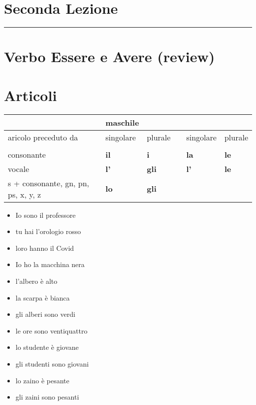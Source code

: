\documentclass[letter,11pt]{article}
\begin{document}
\section*{\Large{Seconda Lezione}}
\noindent\rule{16cm}{1pt}

\section*{Verbo Essere e Avere (review)}

\section*{Articoli}


\begin{tabular}{ |p{3cm}| p{0.2cm}| p{2cm}| p{2cm}| p{0.2cm}| p{2cm}| p{2cm}| }
     &  & {\bf maschile} & & & & \\
    \hline
     aricolo preceduto da &  & singolare & plurale & & singolare & plurale \\
    \hline
    \hline
     &  &  & & & & \\ \hline
    consonante &  & {\bf il} & {\bf i} & & {\bf la}  & {\bf le} \\ \hline
    vocale & & {\bf l'} & {\bf gli} & & {\bf l'}  & {\bf le} \\ \hline
    s + consonante, gn, pn, ps, x, y, z & & {\bf lo} & {\bf gli} &   \\
    \hline
    \hline
\end{tabular}

\vskip 0.5in
\begin{multicols}{2}
\begin{itemize}
    \item Io sono il professore
    \item tu hai l'orologio rosso
    \item loro hanno il Covid
    \item Io ho la macchina nera
    \item l'albero è alto
    \item la scarpa è bianca
    \item gli alberi sono verdi
    \item le ore sono ventiquattro
    \item lo studente è giovane
    \item gli studenti sono giovani
    \item lo zaino è pesante
    \item gli zaini sono pesanti

\end{itemize}
\end{multicols}
\end{document}
